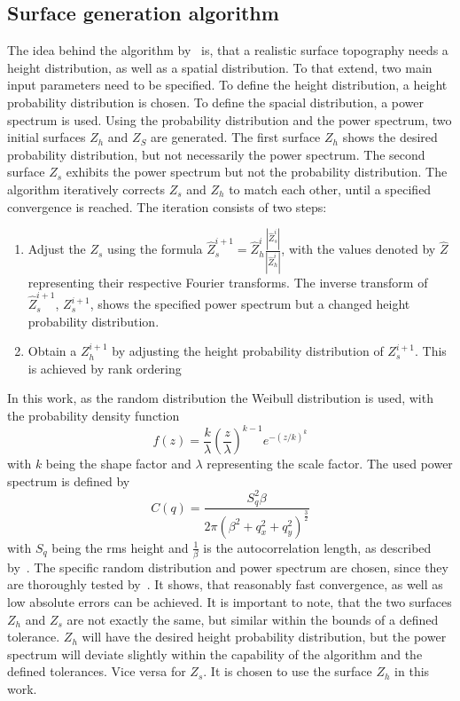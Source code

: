 \subsection{Surface generation algorithm}\label{subsec: Surface generation algorithm}
The idea behind the algorithm by~\cite{perez-rafolsGeneratingRandomlyRough2019} is, that a realistic surface topography needs a height distribution, as well as a spatial distribution.
To that extend, two main input parameters need to be specified.
To define the height distribution, a height probability distribution is chosen.
To define the spacial distribution, a power spectrum is used.
Using the probability distribution and the power spectrum, two initial surfaces $Z_h$ and $Z_S$ are generated. 
The first surface $Z_h$ shows the desired probability distribution, but not necessarily the power spectrum.
The second surface $Z_s$ exhibits the power spectrum but not the probability distribution.
The algorithm iteratively corrects $Z_s$ and $Z_h$ to match each other, until a specified convergence is reached.
The iteration consists of two steps:
\begin{enumerate}
    \item Adjust the $Z_s$ using the formula $\hat{Z}_s^{i+1} = \hat{Z}_h^i \frac{|\hat{Z}_s^i|}{|\hat{Z}_h^i|}$, with the values denoted by $\hat{Z}$ representing their respective Fourier transforms.
    The inverse transform of $\hat{Z}_s^{i+1}$, $Z_s^{i+1}$, shows the specified power spectrum but a changed height probability distribution.
    \item Obtain a $Z_h^{i+1}$ by adjusting the height probability distribution of $Z_s^{i+1}$.
    This is achieved by rank ordering
\end{enumerate}
In this work, as the random distribution the Weibull distribution is used, with the probability density function
\begin{equation}\label{eq: Weibull distribution}
    f(z) = \frac{k}{\lambda} \left(\frac{z}{\lambda}\right)^{k-1} e^{-(z/k)^{k}}
\end{equation}
with $k$ being the shape factor and $\lambda$ representing the scale factor.
The used power spectrum is defined by
\begin{equation}\label{eq: Power spectrum}
    C(q) = \frac{S_q^2 \beta}{2\pi\left(\beta^2 + q_x^2+q_y^2\right)^{\frac{3}{2}}}
\end{equation}
with $S_q$ being the rms height and $\frac{1}{\beta}$ is the autocorrelation length, as described by~\cite{perez-rafolsGeneratingRandomlyRough2019}.
The specific random distribution and power spectrum are chosen, since they are thoroughly tested by~\cite{perez-rafolsGeneratingRandomlyRough2019}.
It shows, that reasonably fast convergence, as well as low absolute errors can be achieved.
It is important to note, that the two surfaces $Z_h$ and $Z_s$ are not exactly the same, but similar within the bounds of a defined tolerance.
$Z_h$ will have the desired height probability distribution, but the power spectrum will deviate slightly within the capability of the algorithm and the defined tolerances.
Vice versa for $Z_s$.
It is chosen to use the surface $Z_h$ in this work.

